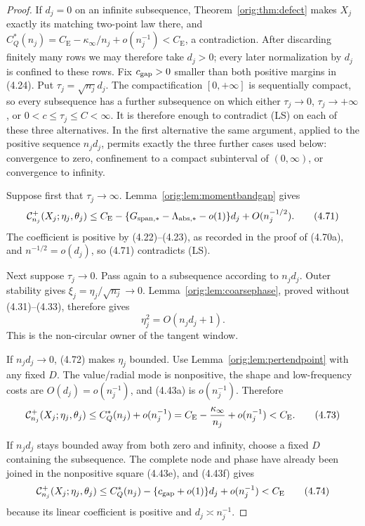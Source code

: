 \documentclass[11pt,a4paper]{article}
\numberwithin{equation}{section}
\theoremstyle{definition}
\theoremstyle{remark}
\newcommand{\CE}{C_{\mathrm E}}
\begin{document}
\begin{proof}
If $d_j=0$ on an infinite subsequence, Theorem~\ref{orig:thm:defect} makes
$X_j$ exactly its matching two-point law there, and
$C_Q^*(n_j)=\CE-\kappa_\infty/n_j+o(n_j^{-1})<\CE$, a contradiction.
After discarding finitely many rows we may therefore take $d_j>0$; every
later normalization by $d_j$ is confined to these rows.
Fix \(c_{\rm gap}>0\) smaller than both positive margins in (4.24).
Put $\tau_j=\sqrt{n_j}d_j$.  The compactification $[0,+\infty]$ is
sequentially compact, so every subsequence has a further subsequence on
which either $\tau_j\to0$, $\tau_j\to+\infty$, or
$0<c\le\tau_j\le C<\infty$.  It is therefore enough to contradict (LS)
on each of these three alternatives.  In the first alternative the same
argument, applied to the positive sequence $n_jd_j$, permits exactly the
three further cases used below: convergence to zero, confinement to a
compact subinterval of $(0,\infty)$, or convergence to infinity.

Suppose first that $\tau_j\to\infty$.  Lemma~\ref{orig:lem:momentbandgap} gives
\[
 \mathcal C_{n_j}^+(X_j;\eta_j,\theta_j)
 \le\CE-\{G_{\rm span,*}-\Lambda_{\rm abs,*}-o(1)\}d_j
             +O(n_j^{-1/2}).                           \tag{4.71}
\]
The coefficient is positive by (4.22)--(4.23), as recorded in the proof of
(4.70a), and $n^{-1/2}=o(d_j)$, so (4.71)
contradicts (LS).

Next suppose $\tau_j\to0$.  Pass again to a subsequence according to
$n_jd_j$.  Outer stability gives $\xi_j=\eta_j/\sqrt {n_j}\to0$.
Lemma~\ref{orig:lem:coarsephase}, proved without (4.31)--(4.33), therefore gives
\[
                         \eta_j^2=O(n_jd_j+1).          \tag{4.72}
\]
This is the non-circular owner of the tangent window.

If $n_jd_j\to0$, (4.72) makes $\eta_j$ bounded.  Use
Lemma~\ref{orig:lem:pertendpoint} with any fixed $D$.  The value/radial mode is
nonpositive, the shape and low-frequency costs are
$O(d_j)=o(n_j^{-1})$, and (4.43a) is $o(n_j^{-1})$.  Therefore
\[
 \mathcal C_{n_j}^+(X_j;\eta_j,\theta_j)
 \le C_Q^*(n_j)+o(n_j^{-1})
 =\CE-{\kappa_\infty\over n_j}+o(n_j^{-1})<\CE.        \tag{4.73}
\]

If $n_jd_j$ stays bounded away from both zero and infinity, choose a fixed
$D$ containing the subsequence.  The complete node and phase have already
been joined in the nonpositive square (4.43e), and (4.43f) gives
\[
 \mathcal C_{n_j}^+(X_j;\eta_j,\theta_j)
 \le C_Q^*(n_j)-\{c_{\rm gap}+o(1)\}d_j+o(n_j^{-1})<\CE \tag{4.74}
\]
because its linear coefficient is positive and $d_j\asymp n_j^{-1}$.


\end{proof}
\end{document}
